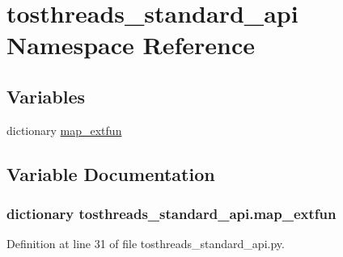 \hypertarget{namespacetosthreads__standard__api}{}\section{tosthreads\+\_\+standard\+\_\+api Namespace Reference}
\label{namespacetosthreads__standard__api}
\subsection*{Variables}
\begin{DoxyCompactItemize}
\item 
dictionary \hyperlink{namespacetosthreads__standard__api_ab1c49f340dcc13d779eb226ac8a5974f}{map\+\_\+extfun}
\end{DoxyCompactItemize}


\subsection{Variable Documentation}
\subsubsection[{\texorpdfstring{map\+\_\+extfun}{map_extfun}}]{\setlength{\rightskip}{0pt plus 5cm}dictionary tosthreads\+\_\+standard\+\_\+api.\+map\+\_\+extfun}\hypertarget{namespacetosthreads__standard__api_ab1c49f340dcc13d779eb226ac8a5974f}{}\label{namespacetosthreads__standard__api_ab1c49f340dcc13d779eb226ac8a5974f}


Definition at line 31 of file tosthreads\+\_\+standard\+\_\+api.\+py.

